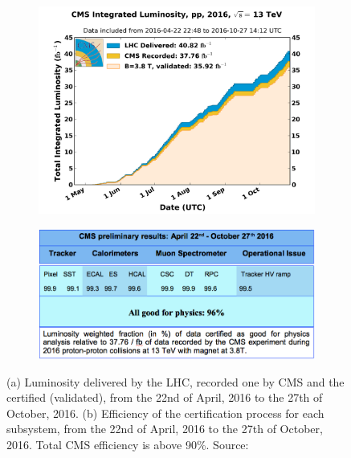 \begin{figure}[htbp]
    \centering
    \begin{subfigure}[b]{0.6\textwidth}
        \centering
        \includegraphics[width=\textwidth]{figures/rpc/lumi_plot.png}  
        \caption{}
    \end{subfigure}
    \hfill
    \begin{subfigure}[b]{0.35\textwidth}
        \centering
        \includegraphics[width=\textwidth]{figures/rpc/lumi_table.png}  
        \caption{}
    \end{subfigure}
    \caption{(a) Luminosity delivered by the LHC, recorded one by CMS and the certified (validated), from the 22nd of April, 2016 to the 27th of October, 2016. (b) Efficiency of the certification process for each subsystem, from the 22nd of April, 2016 to the 27th of October, 2016. Total CMS efficiency is above 90\%. Source:~\cite{certification}}%
    \label{lumi}%
\end{figure}


